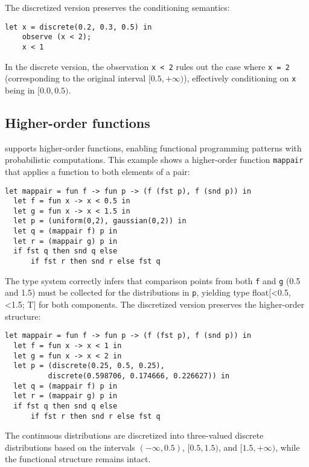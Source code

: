 \documentclass[acmsmall,screen,dvipsnames,x11names,nonacm,anonymous,review]{acmart}
\newcommand{\codetype}[1]{\textcolor{typecolor}{\ttfamily\small#1}}
\newcommand{\Slice}{\text{\scshape Slice}\xspace}
\begin{document}
\noindent The discretized version preserves the conditioning semantics:

\begin{lstlisting}[aboveskip=1em,belowskip=1em]
    let x = discrete(0.2, 0.3, 0.5) in
    observe (x < 2);
    x < 1
\end{lstlisting}

\noindent In the discrete version, the observation \texttt{x < 2} rules out the case where \texttt{x = 2} (corresponding to the original interval $[0.5, +\infty)$), effectively conditioning on \texttt{x} being in $[0.0, 0.5)$.

\subsection{Higher-order functions}

\Slice supports higher-order functions, enabling functional programming patterns with probabilistic computations. This example shows a higher-order function \texttt{mappair} that applies a function to both elements of a pair:

\begin{lstlisting}[aboveskip=1em,belowskip=1em,escapechar=!]
  let mappair = fun f -> fun p -> (f (fst p), f (snd p)) in
  let f = fun x -> x < 0.5 in
  let g = fun x -> x < 1.5 in
  let p = (uniform(0,2), gaussian(0,2)) in
  let q = (mappair f) p in
  let r = (mappair g) p in
  if fst q then snd q else 
      if fst r then snd r else fst q
\end{lstlisting}

\noindent The type system correctly infers that comparison points from both \texttt{f} and \texttt{g} (0.5 and 1.5) must be collected for the distributions in \texttt{p}, yielding type \codetype{float[<0.5,<1.5; T]} for both components. The discretized version preserves the higher-order structure:

\begin{lstlisting}[aboveskip=1em,belowskip=1em]
  let mappair = fun f -> fun p -> (f (fst p), f (snd p)) in
  let f = fun x -> x < 1 in
  let g = fun x -> x < 2 in
  let p = (discrete(0.25, 0.5, 0.25), 
          discrete(0.598706, 0.174666, 0.226627)) in
  let q = (mappair f) p in
  let r = (mappair g) p in
  if fst q then snd q else 
      if fst r then snd r else fst q
\end{lstlisting}

\noindent The continuous distributions are discretized into three-valued discrete distributions based on the intervals $(-\infty, 0.5)$, $[0.5, 1.5)$, and $[1.5, +\infty)$, while the functional structure remains intact.
\end{document}
